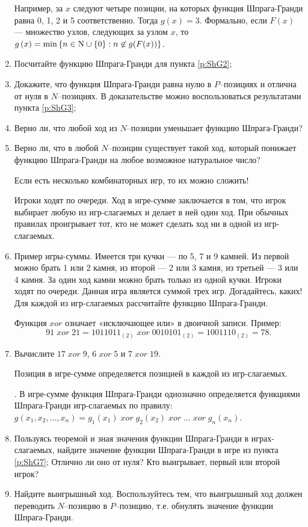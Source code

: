 \begin{problem}
\begin{enumerate}
Например, за  $x$  следуют четыре позиции, на которых функция Шпрага-Гранди равна 0, 1, 2 и 5 соответственно. Тогда  $g\left(x\right)=3$. Формально, если  $F\left(x\right)$  — множество узлов, следующих за узлом  $x$, то  $g\left(x\right)=\min \left\{n\in {\rm N} \cup \left\{0\right\}: n \not \in g(F(x))\right\}$.
\item	Посчитайте функцию Шпрага-Гранди для пункта \ref{p:ShG2};\par
\item	Докажите, что функция Шпрага-Гранди равна нулю в  $P$--позициях и отлична от нуля в  $N$--позициях. В доказательстве можно воспользоваться результатами пункта \ref{p:ShG3};\par
\item	Верно ли, что любой ход из  $N$--позиции уменьшает функцию Шпрага-Гранди?\par
\item	Верно ли, что в любой  $N$--позиции существует такой ход, который понижает функцию Шпрага-Гранди на любое возможное натуральное число?\par
Если есть несколько комбинаторных игр, то их можно сложить! \par
Игроки ходят по очереди. Ход в игре-сумме заключается в том, что игрок выбирает любую из игр-слагаемых и делает в ней один ход. При обычных правилах проигрывает тот, кто не может сделать ход ни в одной из игр-слагаемых.\par
\item\label{p:ShG7}	Пример игры-суммы. Имеется три кучки — по 5, 7 и 9 камней. Из первой можно брать 1 или 2 камня, из второй — 2 или 3 камня, из третьей — 3 или 4 камня. За один ход камни можно брать только из одной кучки. Игроки ходят по очереди. Данная игра является суммой трех игр. Догадайтесь, каких! Для каждой из игр-слагаемых рассчитайте функцию Шпрага-Гранди.\par
Функция  $xor$  означает «исключающее или» в двоичной записи. Пример:
\[91\; xor\; 21=1011011_{\left(2\right)} \; xor\; 0010101_{\left(2\right)} =1001110_{\left(2\right)} =78.\]
\item	Вычислите  $17\; xor\; 9$,  $6\; xor\; 5$  и  $7\; xor\; 19.$ \par

Позиция в игре-сумме определяется позицией в каждой из игр-слагаемых.\par
{}.
В игре-сумме функция Шпрага-Гранди однозначно определяется функциями Шпрага-Гранди игр-слагаемых по правилу:  $g\left(x_{1},x_{2},\ldots,x_{n} \right)=g_{1} \left(x_{1} \right)\; xor\; g_{2} \left(x_{2} \right)\; xor\; \ldots \; xor\; g_{n} \left(x_{n} \right)$.
\item	Пользуясь теоремой и зная значения функции Шпрага-Гранди в играх-слагаемых, найдите значение функции Шпрага-Гранди в игре из пункта \ref{p:ShG7}; Отлично ли оно от нуля? Кто выигрывает, первый или второй игрок?\par
\item	Найдите выигрышный ход. Воспользуйтесь тем, что выигрышный ход должен переводить  $N$--позицию в  $P$--позицию, т.е. обнулять значение функции Шпрага-Гранди.
\end{enumerate}



\end{problem}
